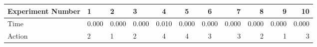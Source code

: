 \documentclass[8pt]{article}
\begin{document}
\begin{landscape}
\begin{tabular}{ | l | l | l | l | c | c | c | r | r | r | r | }
 \hline 
Experiment Number & 1 & 2 & 3 & 4 & 5 & 6 & 7 & 8 & 9 & 10\\ \hline
Time & 0.000 & 0.000 & 0.000 & 0.010 & 0.000 & 0.000 & 0.000 & 0.000 & 0.000 & 0.000\\ \hline
Action & 2 & 1 & 2 & 4 & 4 & 3 & 3 & 2 & 1 & 3\\ \hline\end{tabular}
\end{landscape}
\end{document}
